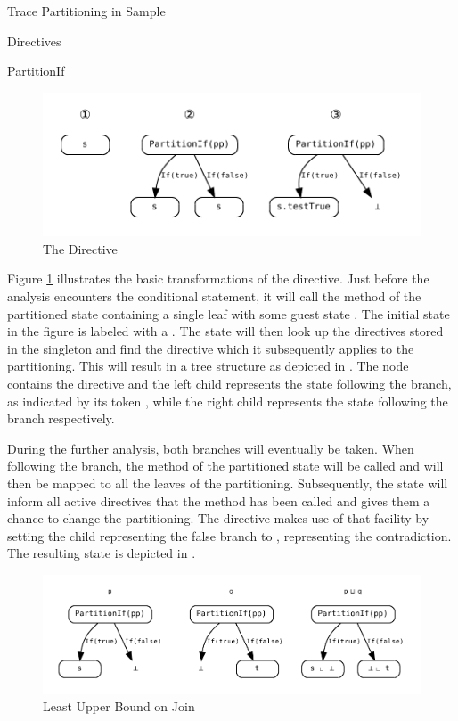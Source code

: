 \begin{chapter}{Trace Partitioning in Sample}
\begin{section}{Directives}
\begin{subsection}{PartitionIf}
			\begin{figure}
				\centering
				\includegraphics[]{Graphs/PartitionIf.pdf}
				\caption{The  Directive}
				\label{figure:PartitionIf}
			\end{figure}

			Figure \ref{figure:PartitionIf} illustrates the basic transformations of the directive. Just before the analysis encounters the conditional statement, it will call the  method of the partitioned state containing a single leaf with some guest state . The initial state in the figure is labeled with a \one. The state will then look up the directives stored in the  singleton and find the  directive which it subsequently applies to the partitioning. This will result in a tree structure as depicted in \two. The node contains the directive and the left child represents the state following the  branch, as indicated by its token , while the right child represents the state following the  branch respectively. 

			During the further analysis, both branches will eventually be taken. When following the  branch, the  method of the partitioned state will be called and will then be mapped to all the leaves of the partitioning. Subsequently, the state will inform all active directives that the  method has been called and gives them a chance to change the partitioning. The  directive makes use of that facility by setting the child representing the false branch to , representing the contradiction. The resulting state is depicted in \three.

			\begin{figure}
				\centering
				\includegraphics[width=\textwidth]{Graphs/PartitionIf_lub.pdf}
				\caption{Least Upper Bound on Join}
				\label{figure:PartitionIf::lub}
			\end{figure}


\end{subsection}
\end{section}
\end{chapter}
